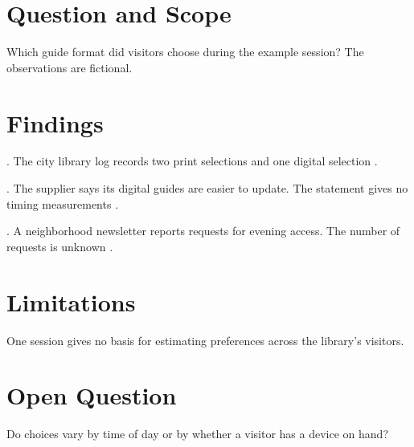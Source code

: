 \documentclass[11pt]{article}
\begin{document}
\MakeReportCover
{}
\pagestyle{report}

\tableofcontents

\section{Question and Scope}
Which guide format did visitors choose during the example session?
The observations are fictional.

\section{Findings}
\PrimaryRecord{}. The city library log records two print selections and one digital selection \cite{demo-library-record}.

\FirstPartyStatement{}. The supplier says its digital guides are easier to update. The statement gives no timing measurements \cite{demo-vendor-statement}.

\SecondaryReporting{}. A neighborhood newsletter reports requests for evening access. The number of requests is unknown \cite{demo-newsletter}.

\section{Limitations}
One session gives no basis for estimating preferences across the library's visitors.

\section{Open Question}
Do choices vary by time of day or by whether a visitor has a device on hand?



\end{document}
